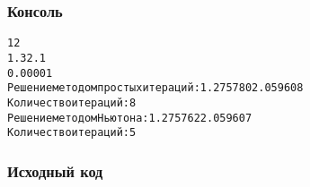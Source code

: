 \subsubsection{Консоль}
\begin{alltt}
1 2
1.3 2.1
0.00001
Решение методом простых итераций: 1.275780 2.059608
Количество итераций: 8
Решение методом Ньютона: 1.275762 2.059607
Количество итераций: 5

\end{alltt}
\pagebreak

\subsubsection{Исходный код}

\pagebreak
